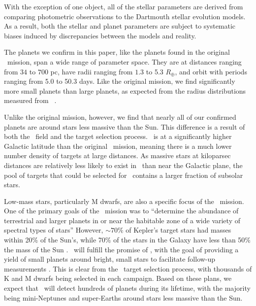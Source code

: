 With the exception of one object, all of the stellar parameters are derived from comparing
photometric observations to the Dartmouth stellar evolution models.
As a result, both the stellar and planet parameters are subject to systematic biases induced
by discrepancies between the models and reality.


The planets we confirm in this paper, like the planets found in the original \kep\ mission,
span a wide range of parameter space.
They are at distances ranging from $34$ to $700$ pc, have radii ranging from $1.3$ to
5.3 $R_\oplus$, and orbit with periods ranging from 5.0 to 50.3 days.
Like the original mission, we find significantly more small planets than large planets, as
expected from the radius distributions measured from \kep\
\citep{Howard12, Fressin13, Morton14}.

Unlike the original mission, however, we find that nearly all of our confirmed planets
are around stars less massive than the Sun.
This difference is a result of both the \Ci\ field and the target selection process.
\Ci\ is at a significantly higher Galactic latitude than the original \kep\ mission,
meaning there is a much lower number density of targets at large distances.
As massive stars
at kiloparsec distances are relatively less likely to exist in \Ci\ than near the
Galactic plane, the pool of targets that could be selected for \Ci\ contains a larger
fraction of subsolar stars.

Low-mass stars, particularly M dwarfs, are also a specific focus of the \KT\ mission.
One of the primary goals of the \kep\ mission was to ``determine the abundance of
terrestrial and larger planets in or near the habitable zone of a wide variety of spectral
types of stars'' \citep{Batalha13} However, $\sim70\%$ of Kepler's target stars had
masses within 20\%
of the Sun's, while 70\% of the stars in the Galaxy have less than 50\% the mass of the
Sun \citep{Brown11}.
\KT\ will fulfill the promise of \kep, with the goal of providing a yield of small planets
around bright, small stars to facilitate follow-up measurements \citep{Howell14}.
This is clear from the \KT\ target selection process, with thousands of K and M dwarfs
being selected in each campaign.
Based on these plans, we expect that \KT\ will detect hundreds of planets during its
lifetime, with the majority being mini-Neptunes and super-Earths around stars
less massive than the Sun.















